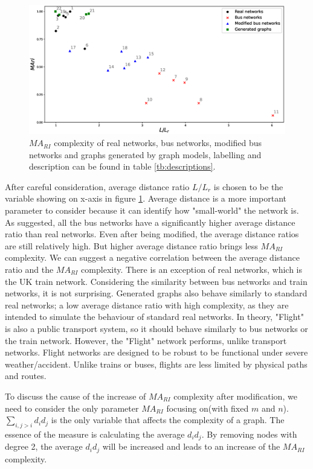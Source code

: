 \documentclass[12pt]{article}
\begin{document}
\begin{figure}[ht]
    \includegraphics[width = \textwidth]{real_networks.eps}
    \caption{$MA_{RI}$ complexity of real networks, bus networks, modified bus networks and graphs generated by graph models, labelling and description can be found in table \ref{tb:descriptions}.}
    \label{fig:real_networks}
\end{figure}
\par
After careful consideration, average distance ratio $L/L_r$ is chosen to be the variable showing on x-axis in figure \ref{fig:real_networks}. Average distance is a more important parameter to consider because it can identify how "small-world" the network is. As suggested, all the bus networks have a significantly higher average distance ratio than real networks. Even after being modified, the average distance ratios are still relatively high. But higher average distance ratio brings less $MA_{RI}$ complexity. We can suggest a negative correlation between the average distance ratio and the $MA_{RI}$ complexity. There is an exception of real networks, which is the UK train network. Considering the similarity between bus networks and train networks, it is not surprising. Generated graphs also behave similarly to standard real networks; a low average distance ratio with high complexity, as they are intended to simulate the behaviour of standard real networks. In theory, "Flight" is also a public transport system, so it should behave similarly to bus networks or the train network. However, the "Flight" network performs, unlike transport networks. Flight networks are designed to be robust\cite{zhixing2021recent} to be functional under severe weather/accident. Unlike trains or buses, flights are less limited by physical paths and routes.\par
To discuss the cause of the increase of $MA_{RI}$ complexity after modification, we need to consider the only parameter $MA_{RI}$ focusing on(with fixed $m$ and $n$). $\sum_{i,j>i}d_id_j$ is the only variable that affects the complexity of a graph. The essence of the measure is calculating the average $d_id_j$. By removing nodes with degree 2, the average $d_id_j$ will be increased and leads to an increase of the $MA_{RI}$ complexity.
\end{document}
